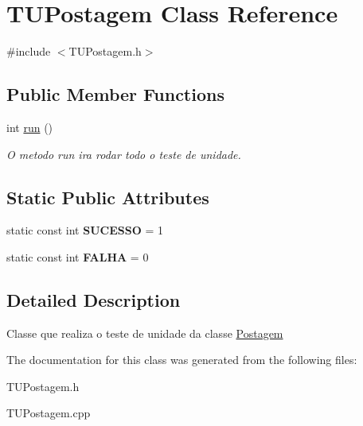 \hypertarget{classTUPostagem}{}\section{T\+U\+Postagem Class Reference}
\label{classTUPostagem}


{\ttfamily \#include $<$T\+U\+Postagem.\+h$>$}

\subsection*{Public Member Functions}
\begin{DoxyCompactItemize}
\item 
int \hyperlink{classTUPostagem_adc2f5c58329f9eb1ce356b3415a27e5c}{run} ()\hypertarget{classTUPostagem_adc2f5c58329f9eb1ce356b3415a27e5c}{}\label{classTUPostagem_adc2f5c58329f9eb1ce356b3415a27e5c}

\begin{DoxyCompactList}\small\item\em O metodo run ira rodar todo o teste de unidade. \end{DoxyCompactList}\end{DoxyCompactItemize}
\subsection*{Static Public Attributes}
\begin{DoxyCompactItemize}
\item 
static const int {\bfseries S\+U\+C\+E\+S\+SO} = 1\hypertarget{classTUPostagem_aff97571608f15258b4e84ee6cdd9aa6f}{}\label{classTUPostagem_aff97571608f15258b4e84ee6cdd9aa6f}

\item 
static const int {\bfseries F\+A\+L\+HA} = 0\hypertarget{classTUPostagem_a3aac605c0d979a617ff5a10376648f5a}{}\label{classTUPostagem_a3aac605c0d979a617ff5a10376648f5a}

\end{DoxyCompactItemize}


\subsection{Detailed Description}
Classe que realiza o teste de unidade da classe \hyperlink{classPostagem}{Postagem} 

The documentation for this class was generated from the following files\+:\begin{DoxyCompactItemize}
\item 
T\+U\+Postagem.\+h\item 
T\+U\+Postagem.\+cpp\end{DoxyCompactItemize}
